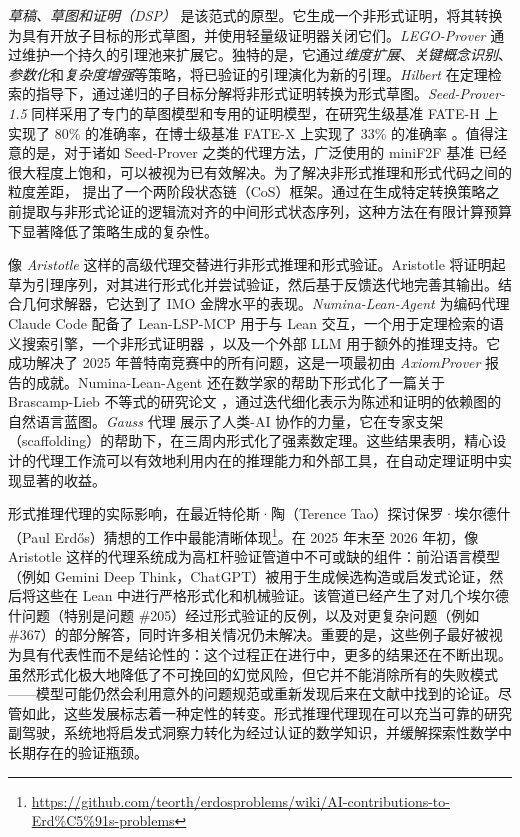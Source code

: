 \documentclass[11pt]{article}
\numberwithin{equation}{section}
\begin{document}
\textit{草稿、草图和证明（DSP）} \cite{jiang2023draft} 是该范式的原型。它生成一个非形式证明，将其转换为具有开放子目标的形式草图，并使用轻量级证明器关闭它们。\textit{LEGO-Prover} \cite{wang2024legoprover} 通过维护一个持久的引理池来扩展它。独特的是，它通过\textit{维度扩展}、\textit{关键概念识别}、\textit{参数化}和\textit{复杂度增强}等策略，将已验证的引理演化为新的引理。\textit{Hilbert} \cite{varambally2025hilbert} 在定理检索的指导下，通过递归的子目标分解将非形式证明转换为形式草图。\textit{Seed-Prover-1.5} \cite{Chen_et_al_2025_Seed-Prover1.5} 同样采用了专门的草图模型和专用的证明模型，在研究生级基准 FATE-H 上实现了 80\% 的准确率，在博士级基准 FATE-X 上实现了 33\% 的准确率 \cite{jiang2025fate}。值得注意的是，对于诸如 Seed-Prover 之类的代理方法，广泛使用的 miniF2F 基准 \cite{zheng2021minif2f} 已经很大程度上饱和，可以被视为已有效解决。为了解决非形式推理和形式代码之间的粒度差距，\cite{wang2025translating} 提出了一个两阶段状态链（CoS）框架。通过在生成特定转换策略之前提取与非形式论证的逻辑流对齐的中间形式状态序列，这种方法在有限计算预算下显著降低了策略生成的复杂性。

像 \textit{Aristotle} \cite{achim2025aristotle} 这样的高级代理交替进行非形式推理和形式验证。Aristotle 将证明起草为引理序列，对其进行形式化并尝试验证，然后基于反馈迭代地完善其输出。结合几何求解器，它达到了 IMO 金牌水平的表现。\textit{Numina-Lean-Agent} \cite{liu2026numina} 为编码代理 Claude Code 配备了 Lean-LSP-MCP \cite{lean-lsp-mcp} 用于与 Lean 交互，一个用于定理检索的语义搜索引擎，一个非形式证明器 \cite{huang2025winning}，以及一个外部 LLM 用于额外的推理支持。它成功解决了 2025 年普特南竞赛中的所有问题，这是一项最初由 \textit{AxiomProver} \cite{axiommath_fromSeeingWhy_2025} 报告的成就。Numina-Lean-Agent 还在数学家的帮助下形式化了一篇关于 Brascamp-Lieb 不等式的研究论文 \cite{benard2025effective}，通过迭代细化表示为陈述和证明的依赖图的自然语言蓝图。\textit{Gauss} 代理 \cite{mathinc_gauss} 展示了人类-AI 协作的力量，它在专家支架（scaffolding）的帮助下，在三周内形式化了强素数定理。这些结果表明，精心设计的代理工作流可以有效地利用内在的推理能力和外部工具，在自动定理证明中实现显著的收益。

形式推理代理的实际影响，在最近特伦斯·陶（Terence Tao）探讨保罗·埃尔德什（Paul Erdős）猜想的工作中最能清晰体现\footnote{\href{https://github.com/teorth/erdosproblems/wiki/AI-contributions-to-Erd\%C5\%91s-problems}
     {https://github.com/teorth/erdosproblems/wiki/AI-contributions-to-Erd\%C5\%91s-problems}}。在 2025 年末至 2026 年初，像 Aristotle 这样的代理系统成为高杠杆验证管道中不可或缺的组件：前沿语言模型（例如 Gemini Deep Think，ChatGPT）被用于生成候选构造或启发式论证，然后将这些在 Lean 中进行严格形式化和机械验证。该管道已经产生了对几个埃尔德什问题（特别是问题 \#205）经过形式验证的反例，以及对更复杂问题（例如 \#367）的部分解答，同时许多相关情况仍未解决。重要的是，这些例子最好被视为具有代表性而不是结论性的：这个过程正在进行中，更多的结果还在不断出现。虽然形式化极大地降低了不可挽回的幻觉风险，但它并不能消除所有的失败模式——模型可能仍然会利用意外的问题规范或重新发现后来在文献中找到的论证。尽管如此，这些发展标志着一种定性的转变。形式推理代理现在可以充当可靠的研究副驾驶，系统地将启发式洞察力转化为经过认证的数学知识，并缓解探索性数学中长期存在的验证瓶颈。
\end{document}
